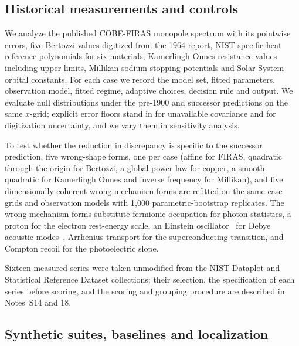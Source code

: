 \documentclass{article}
\begin{document}
\subsection{Historical measurements and controls}

We analyze the published COBE-FIRAS monopole spectrum with its pointwise errors,
five Bertozzi values digitized from the 1964 report, NIST specific-heat reference
polynomials for six materials, Kamerlingh Onnes resistance values including upper limits,
Millikan sodium stopping potentials and Solar-System orbital constants. For each case we record the model set, fitted parameters, observation model, fitted regime, adaptive choices, decision rule and output. We evaluate null distributions under the pre-1900 and successor predictions
on the same $x$-grid; explicit error floors stand in for
unavailable covariance and for digitization uncertainty, and we vary them in
sensitivity analysis.

To test whether the reduction in discrepancy is specific to the successor prediction,
five wrong-shape forms, one per case (affine for FIRAS, quadratic through the origin for Bertozzi, a global power law for copper, a smooth quadratic for Kamerlingh Onnes and inverse frequency for Millikan), and five dimensionally coherent wrong-mechanism forms are refitted on the same case grids and observation models with 1,000 parametric-bootstrap
replicates. The wrong-mechanism forms substitute fermionic occupation for photon
statistics, a proton for the electron rest-energy scale, an Einstein oscillator~\cite{einstein1907solid}
for Debye acoustic modes~\cite{debye1912}, Arrhenius transport for the superconducting transition,
and Compton recoil for the photoelectric slope.

Sixteen measured series were taken unmodified from the NIST Dataplot and Statistical Reference Dataset collections; their selection, the specification of each series before scoring, and the scoring and grouping procedure are described in Notes~S14 and 18.

\subsection{Synthetic suites, baselines and localization}
\end{document}
